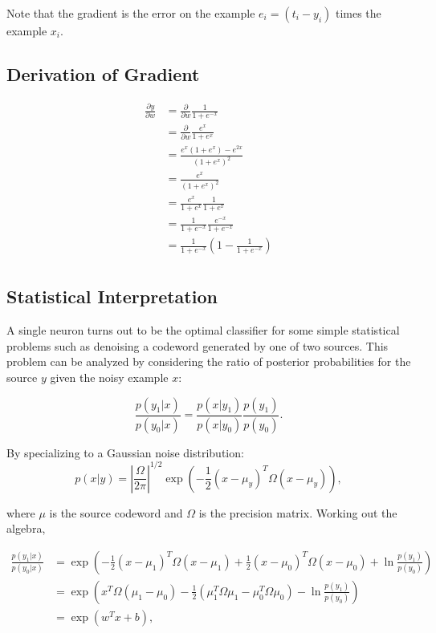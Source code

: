 \documentclass{article}
\begin{document}
Note that the gradient is the error on the example $e_i = (t_i - y_i)$ times the example $x_i$.

\subsection{Derivation of Gradient}

\begin{align}
\frac{\partial y}{\partial w} & = \frac{\partial}{\partial w}\frac{1}{1 + e^{-x}} \\
&= \frac{\partial}{\partial w}\frac{e^x}{1 + e^x} \\
&= \frac{e^x (1 + e^x) - e^{2x}}{(1 + e^x)^2} \\
&= \frac{e^x}{(1 + e^x)^2} \\
&= \frac{e^x}{1 + e^x} \frac{1}{1 + e^x} \\
&= \frac{1}{1 + e^{-x}} \frac{e^{-x}}{1 + e^{-x}} \\
&= \frac{1}{1 + e^{-x}} \left(1 - \frac{1}{1 + e^{-x}} \right) \\
\end{align}

\subsection{Statistical Interpretation}

A single neuron turns out to be the optimal classifier for some simple statistical problems such as denoising a codeword generated by one of two sources.  This problem can be analyzed by considering the ratio of posterior probabilities for the source $y$ given the noisy example $x$:

\begin{equation}
\frac{p(y_1 | x)}{p(y_0 | x)} = \frac{p(x | y_1)}{p(x | y_0)} \frac{p(y_1)}{p(y_0)}.
\end{equation}

By specializing to a Gaussian noise distribution:
\begin{equation}
p(x | y) = \left| \frac{\Omega}{2 \pi} \right|^{1/2} \exp \left( -\frac{1}{2} (x - \mu_y)^T \Omega (x - \mu_y) \right),
\end{equation}

where $\mu$ is the source codeword and $\Omega$ is the precision matrix.  Working out the algebra,

\begin{align}
\frac{p(y_1 | x)}{p(y_0 | x)} &= \exp\left(-\frac{1}{2}(x-\mu_1)^T\Omega(x-\mu_1) + \frac{1}{2}(x-\mu_0)^T\Omega(x-\mu_0) + \ln \frac{p(y_1)}{p(y_0)} \right) \\
& =  \exp \left( x^T \Omega (\mu_1 - \mu_0) - \frac{1}{2} (\mu_1^T \Omega \mu_1 - \mu_0^T \Omega \mu_0) - \ln \frac{p(y_1)}{p(y_0)} \right) \\
& =  \exp (w^T x + b),
\end{align}
\end{document}
